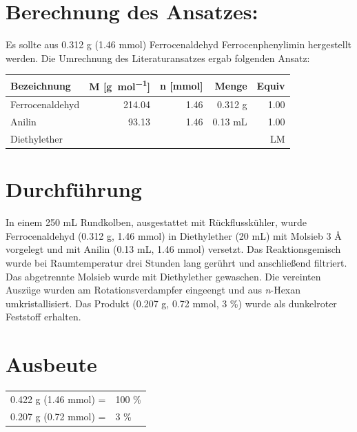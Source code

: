 \documentclass[12pt]{article}
\begin{document}
\begin{onehalfspace}

\section{Berechnung des Ansatzes: }
Es sollte aus 0.312 g (1.46 \si{\milli\mol}) Ferrocenaldehyd Ferrocenphenylimin hergestellt werden.
Die Umrechnung des Literaturansatzes\cite{durch} ergab folgenden Ansatz:\\[0.5cm]
\begin{tabularx}{\textwidth}{lrrrr}
\toprule
\textbf{Bezeichnung}&\textbf{ M [\si{\gram\per\mol}]} & \textbf{n [\si{\milli\mol}]} & \textbf{Menge} & \textbf{Equiv}\\
\midrule
Ferrocenaldehyd & 214.04 & 1.46  &  0.312 \si{\gram} &1.00   \\
Anilin          & 93.13  & 1.46  &  0.13 \si{\milli\liter} & 1.00  \\
Diethylether    &  &  &  & LM   \\
\bottomrule
\end{tabularx}


\normalsize \section{Durchführung \cite{durch}}
In einem 250 \si{\milli\liter} Rundkolben, ausgestattet mit Rückflusskühler, wurde Ferrocenaldehyd (0.312 g, 1.46 \si{\milli\mol}) in Diethylether (20 \si{\milli\liter}) mit Molsieb 3 \si{\angstrom} vorgelegt und mit Anilin (0.13 \si{\milli\liter}, 1.46 \si{\milli\mol}) versetzt. Das Reaktionsgemisch wurde bei Raumtemperatur drei Stunden lang gerührt und anschließend filtriert. Das abgetrennte Molsieb wurde mit Diethylether gewaschen. Die vereinten Auszüge wurden am Rotationsverdampfer eingeengt und aus \textit{n}-Hexan umkristallisiert. Das Produkt (0.207 \si{\gram}, 0.72 \si{\milli\mol}, 3 \%) wurde als dunkelroter Feststoff erhalten.

\section{Ausbeute}
\begin{tabular}{ll}
  0.422 \si{\gram} (1.46 \si{\milli\mol}) =  & 100 \%\\
  0.207 \si{\gram} (0.72 \si{\milli\mol}) =  & 3 \%  \\
\end{tabular}

\end{onehalfspace}
\end{document}
